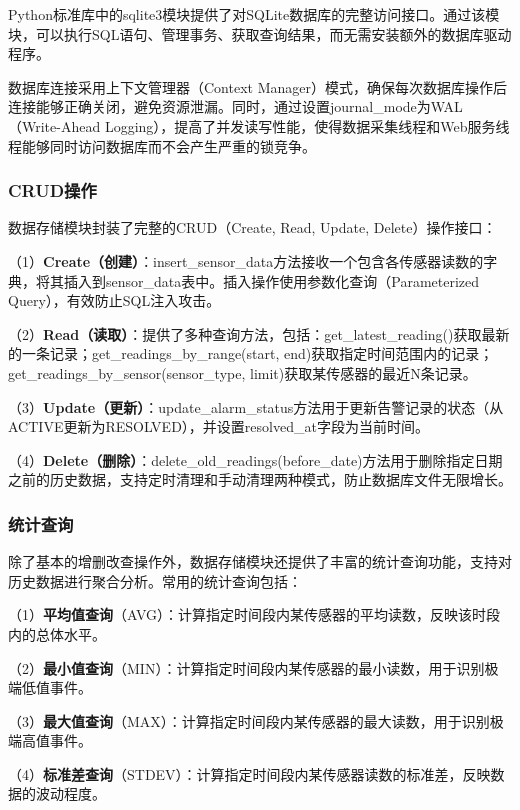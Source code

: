 \documentclass[12pt,a4paper]{ctexart}
\begin{document}
Python标准库中的sqlite3模块提供了对SQLite数据库的完整访问接口。通过该模块，可以执行SQL语句、管理事务、获取查询结果，而无需安装额外的数据库驱动程序。

数据库连接采用上下文管理器（Context Manager）模式，确保每次数据库操作后连接能够正确关闭，避免资源泄漏。同时，通过设置journal\_mode为WAL（Write-Ahead Logging），提高了并发读写性能，使得数据采集线程和Web服务线程能够同时访问数据库而不会产生严重的锁竞争。

\subsubsection{CRUD操作}

数据存储模块封装了完整的CRUD（Create, Read, Update, Delete）操作接口：

（1）\textbf{Create（创建）}：insert\_sensor\_data方法接收一个包含各传感器读数的字典，将其插入到sensor\_data表中。插入操作使用参数化查询（Parameterized Query），有效防止SQL注入攻击。

（2）\textbf{Read（读取）}：提供了多种查询方法，包括：get\_latest\_reading()获取最新的一条记录；get\_readings\_by\_range(start, end)获取指定时间范围内的记录；get\_readings\_by\_sensor(sensor\_type, limit)获取某传感器的最近N条记录。

（3）\textbf{Update（更新）}：update\_alarm\_status方法用于更新告警记录的状态（从ACTIVE更新为RESOLVED），并设置resolved\_at字段为当前时间。

（4）\textbf{Delete（删除）}：delete\_old\_readings(before\_date)方法用于删除指定日期之前的历史数据，支持定时清理和手动清理两种模式，防止数据库文件无限增长。

\subsubsection{统计查询}

除了基本的增删改查操作外，数据存储模块还提供了丰富的统计查询功能，支持对历史数据进行聚合分析。常用的统计查询包括：

（1）\textbf{平均值查询}（AVG）：计算指定时间段内某传感器的平均读数，反映该时段内的总体水平。

（2）\textbf{最小值查询}（MIN）：计算指定时间段内某传感器的最小读数，用于识别极端低值事件。

（3）\textbf{最大值查询}（MAX）：计算指定时间段内某传感器的最大读数，用于识别极端高值事件。

（4）\textbf{标准差查询}（STDEV）：计算指定时间段内某传感器读数的标准差，反映数据的波动程度。
\end{document}
